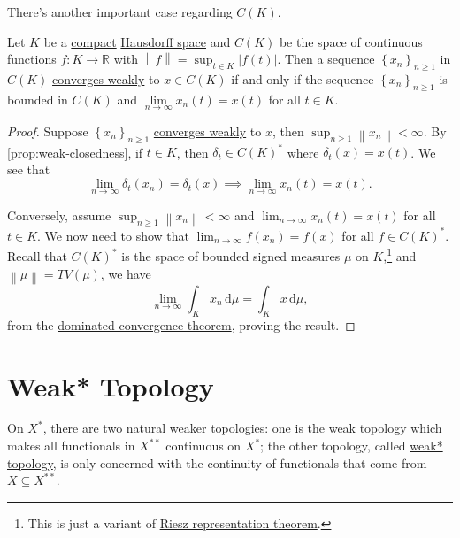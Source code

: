 There's another important case regarding \(C(K)\).

\begin{theorem}\label{thm:weak-convergence-in-CK}
	Let \(K\) be a \hyperref[def:compact]{compact} \hyperref[def:Hausdorff]{Hausdorff space} and \(C(K)\) be the space of continuous functions \(f\colon K\to \mathbb{R} \) with \(\left\lVert f\right\rVert = \sup _{t\in K} \left\vert f(t) \right\vert \). Then a sequence \(\left\{ x_n \right\}_{n \geq 1} \) in \(C(K)\) \hyperref[def:weakly-convergence]{converges weakly} to \(x\in C(K)\)  if and only if the sequence \(\left\{ x_n \right\} _{n\geq 1}\) is bounded in \(C(K)\) and \(\lim\limits_{n \to \infty} x_n(t)=x(t)\) for all \(t\in K\).
\end{theorem}
\begin{proof}
	Suppose \(\left\{ x_n \right\} _{n \geq 1}\) \hyperref[def:weakly-convergence]{converges weakly} to \(x\), then \(\sup _{n\geq 1} \left\lVert x_n\right\rVert < \infty \). By \autoref{prop:weak-closedness}, if \(t\in K\), then \(\delta _t\in C(K)^{\ast} \) where \(\delta _t(x) = x(t)\). We see that
	\[
		\lim_{n \to \infty} \delta _t(x_n) = \delta _t(x)\implies \lim_{n \to \infty} x_n(t) = x(t).
	\]

	Conversely, assume \(\sup _{n\geq 1}\left\lVert x_n\right\rVert < \infty \) and \(\lim_{n \to \infty} x_n(t) = x(t)\) for all \(t\in K\). We now need to show that \(\lim_{n \to \infty} f(x_{n} ) = f(x)\) for all \(f\in C(K)^{\ast} \). Recall that \(C(K)^{\ast} \) is the space of bounded signed measures \(\mu \) on \(K\),\footnote{This is just a variant of \hyperref[thm:Riesz-representation]{Riesz representation theorem}.} and \(\left\lVert \mu \right\rVert = TV(\mu )\), we have
	\[
		\lim_{n \to \infty} \int _K x_n \,\mathrm{d} \mu = \int_K x \,\mathrm{d} \mu,
	\]
	from the \href{https://en.wikipedia.org/wiki/Dominated_convergence_theorem}{dominated convergence theorem}, proving the result.
\end{proof}

\section{Weak* Topology}
On \(X^{\ast} \), there are two natural weaker topologies: one is the \hyperref[def:weak-topology]{weak topology} which makes all functionals in \(X^{\ast\ast} \) continuous on \(X^{\ast} \); the other topology, called \hyperref[def:weak*-topology]{weak* topology}, is only concerned with the continuity of functionals that come from \(X \subseteq X^{\ast\ast} \).

